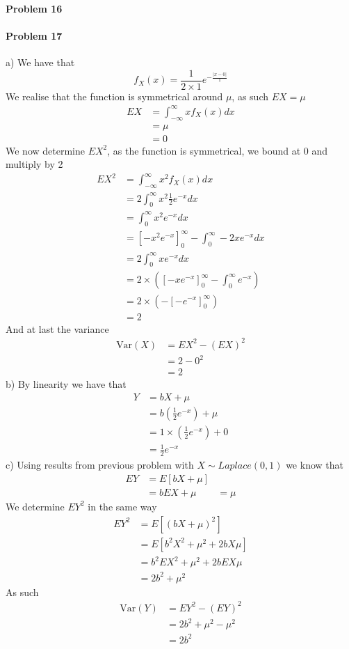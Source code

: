 \paragraph{Problem 16}
\paragraph{Problem 17}
a)
We have that
\[
    f_{X}(x)=\frac{1}{2\times 1}e^{-\frac{|x-0|}{1}}
\]
We realise that the function is symmetrical around $\mu$, as such $EX=\mu$
\begin{align*}
    EX&=\int_{-\infty}^{\infty}xf_{X}(x)dx \\
      &=\mu \\
      &=0
\end{align*}
We now determine $EX^{2}$, as the function is symmetrical, we bound at 0 and multiply by 2
\begin{align*}
    EX^{2}&=\int_{-\infty}^{\infty}x^{2}f_{X}(x)dx \\
      &=2\int_{0}^{\infty}x^{2}\frac{1}{2}e^{-x}dx \\
      &=\int_{0}^{\infty}x^{2}e^{-x}dx \\
      &=\left[-x^{2}e^{-x}\right]_{0}^{\infty}-\int_{0}^{\infty}-2xe^{-x}dx \\
      &=2\int_{0}^{\infty}xe^{-x}dx \\
      &=2\times\left(\left[-xe^{-x}\right]_{0}^{\infty}-\int_{0}^{\infty}e^{-x}\right) \\
      &=2\times\left(-\left[-e^{-x}\right]_{0}^{\infty}\right) \\
      &=2
\end{align*}
And at last the variance
\begin{align*}
    \text{Var}(X)&=EX^{2}-(EX)^{2} \\
             &=2-0^{2} \\
             &=2
\end{align*}
b)
By linearity we have that
\begin{align*}
    Y&=bX+\mu \\
     &=b\left(\frac{1}{2}e^{-x}\right)+\mu \\
     &=1\times\left(\frac{1}{2}e^{-x}\right)+0 \\
     &=\frac{1}{2}e^{-x}
\end{align*}
c)
Using results from previous problem with $X\sim Laplace(0,1)$ we know that
\begin{align*}
    EY&=E[bX+\mu] \\
      &=bEX+\mu
      &=\mu
\end{align*}
We determine $EY^{2}$ in the same way
\begin{align*}
    EY^{2}&=E[(bX+\mu)^{2}] \\
          &=E[b^{2}X^{2}+\mu^{2}+2bX\mu] \\
          &=b^{2}EX^{2}+\mu^{2}+2bEX\mu \\
          &=2b^{2}+\mu^{2}
\end{align*}
As such
\begin{align*}
    \text{Var}(Y)&=EY^{2}-(EY)^{2} \\
             &=2b^{2}+\mu^{2}-\mu^{2} \\
             &=2b^{2}
\end{align*}
